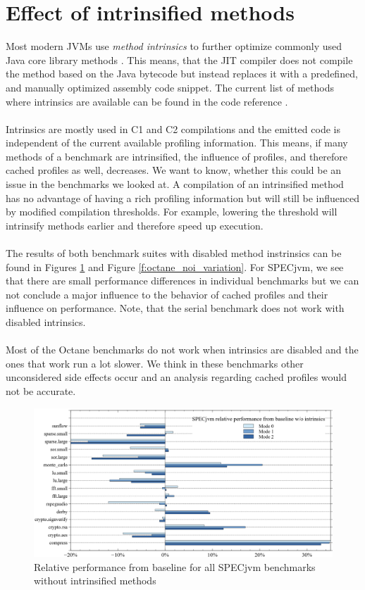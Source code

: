 \section{Effect of intrinsified methods}
\label{s:perf_intrinsics}
Most modern JVMs use \textit{method intrinsics} to further optimize commonly used Java core library methods \cite{intrinsics_talk}.
This means, that the JIT compiler does not compile the method based on the Java bytecode but instead replaces it with a predefined, and manually optimized assembly code snippet. The current list of methods where intrinsics are available can be found in the code reference \cite{code_intrinsics}.
\\\\
Intrinsics are mostly used in C1 and C2 compilations and the emitted code is independent of the current available profiling information.
This means, if many methods of a benchmark are intrinsified, the influence of profiles, and therefore cached profiles as well, decreases.
We want to know, whether this could be an issue in the benchmarks we looked at. A compilation of an intrinsified method has no advantage of having a rich profiling information but will still be influenced by modified compilation thresholds. For example, lowering the threshold will intrinsify methods earlier and therefore speed up execution.
\\\\
The results of both benchmark suites with disabled method instrinsics can be found in Figures \ref{f:all_warmup_noi_variation} and Figure \ref{f:octane_noi_variation}.
For SPECjvm, we see that there are small performance differences in individual benchmarks but we can not conclude a major influence to the behavior of cached profiles and their influence on performance. Note, that the serial benchmark does not work with disabled intrinsics.
\\\\
Most of the Octane benchmarks do not work when intrinsics are disabled and the ones that work run a lot slower. We think in these benchmarks other unconsidered side effects occur and an analysis regarding cached profiles would not be accurate.
\begin{figure}[ht]
  \begin{center}
    \centering
    \includegraphics[width=1.0\textwidth]{figures/all_warmup_noi_variation.png}
    \caption{Relative performance from baseline for all SPECjvm benchmarks without intrinsified methods}
    \label{f:all_warmup_noi_variation}
  \end{center}
\end{figure}
